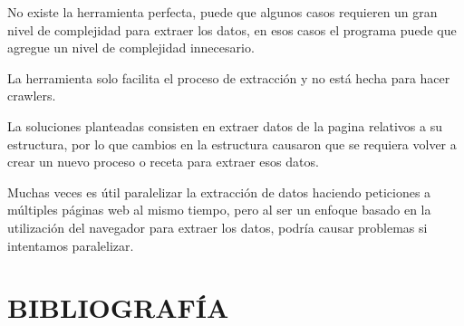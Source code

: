 \documentclass[12pt]{report}
\begin{document}
No existe la herramienta perfecta, puede que algunos casos requieren un gran nivel de complejidad para extraer los datos, en esos casos el programa puede que agregue un nivel de complejidad innecesario.

La herramienta solo facilita el proceso de extracción y no está hecha para hacer crawlers.

La soluciones planteadas consisten en extraer datos de la pagina relativos a su estructura, por lo que cambios en la estructura causaron que se requiera volver a crear un nuevo proceso o receta para extraer esos datos.

Muchas veces es útil paralelizar la extracción de datos haciendo peticiones a múltiples páginas web al mismo tiempo, pero al ser un enfoque basado en la utilización del navegador para extraer los datos, podría causar problemas si intentamos paralelizar.

\break

\section[Bibliografía]{BIBLIOGRAFÍA}

\nocite{*}



\break
\end{document}
